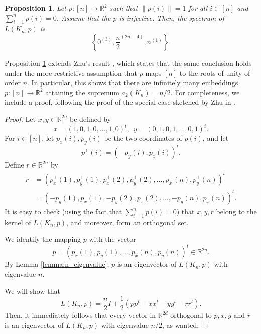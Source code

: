 \documentclass[a4paper,11pt]{article}
\theoremstyle{plain}
\newtheorem{proposition}[theorem]{\bf Proposition}
\theoremstyle{definition}
\newcommand{\Rea}{{\mathbb R}}
\begin{document}
\begin{proposition}\label{prop:2d}
Let $p:[n]\to\Rea^2$ such that $\|p(i)\|=1$ for all $i\in[n]$ and $\sum_{i=1}^n p(i)=0$. Assume that the $p$ is injective. Then, the spectrum of $L(K_n,p)$ is
\[
\left\{ 0^{(3)}, \frac{n}{2}^{(2n-4)},n^{(1)}\right\}.
\]
\end{proposition}
Proposition \ref{prop:2d} extends Zhu's result \cite[Remark 3.4.1]{zhu2013quantitative}, which states that the same conclusion holds under the more restrictive assumption that $p$ maps $[n]$ to the roots of unity of order $n$. In particular, this shows that there are infinitely many embeddings $p:[n]\to \Rea^2$ attaining the supremum $a_2(K_n)=n/2$. For completeness, we include a proof, following the proof of the special case sketched by Zhu in \cite{zhu2013quantitative}.
\begin{proof}
Let $x,y\in \Rea^{2n}$ be defined by 
\[
    x= (1,0,1,0,\ldots,1,0)^t,\ \ 
    y= (0,1,0,1,\ldots,0,1)^t.
\]
For $i\in [n]$, let $p_x(i),p_y(i)$ be the two coordinates of $p(i)$, and let
\[
    p^{\perp}(i)= (-p_y(i),p_x(i))^t.
\]
Define $r\in \Rea^{2n}$ by
\begin{align*}
    r&=
    (p_x^{\perp}(1),p_y^{\perp}(1),p_x^{\perp}(2),p_y^{\perp}(2),\ldots,p_x^{\perp}(n),p_y^{\perp}(n))^t
    \\&=
    (-p_y(1),p_x(1),-p_y(2),p_x(2),\ldots,-p_y(n),p_x(n))^t.
\end{align*}
It is easy to check (using the fact that $\sum_{i=1}^n p(i)=0$) that $x,y,r$ belong to the kernel of $L(K_n,p)$, and moreover, form an orthogonal set.

We identify the mapping $p$ with the vector
\[
    p= (p_x(1),p_y(1),\ldots,p_x(n),p_y(n))^t\in \Rea^{2n}.
\]
By Lemma \ref{lemma:n_eigenvalue}, $p$ is an eigenvector of $L(K_n,p)$ with eigenvalue $n$.

We will show that
\begin{equation}\label{eq:zhu}
    L(K_n,p)= \frac{n}{2}I +\frac{1}{2} (p p^t -x x^t -y y^t -r r^t).
\end{equation}
Then, it immediately follows that every vector in $\Rea^{2d}$ orthogonal to $p,x,y$ and $r$ is an eigenvector of $L(K_n,p)$ with eigenvalue $n/2$, as wanted.


\end{proof}
\end{document}
